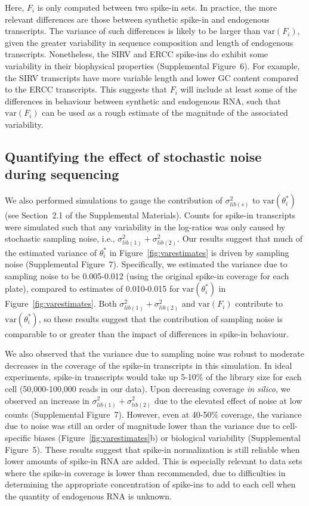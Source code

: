 \documentclass{article}
\newcommand{\suppfigcell}{5}
\newcommand{\suppfigbiophys}{6}
\newcommand{\suppfignoise}{7}
\newcommand{\suppsecnoise}{2.1}
\newcommand\variance{\mbox{var}}
\begin{document}
Here, $F_i$ is only computed between two spike-in sets.
In practice, the more relevant differences are those between synthetic spike-in and endogenous transcripts.
The variance of such differences is likely to be larger than $\variance(F_i)$, given the greater variability in sequence composition and length of endogenous transcripts.
Nonetheless, the SIRV and ERCC spike-ins do exhibit some variability in their biophysical properties (Supplemental Figure~\suppfigbiophys{}).
For example, the SIRV transcripts have more variable length and lower GC content compared to the ERCC transcripts.
This suggests that $F_i$ will include at least some of the differences in behaviour between synthetic and endogenous RNA, such that $\variance(F_i)$ can be used as a rough estimate of the magnitude of the associated variability.

\subsection*{Quantifying the effect of stochastic noise during sequencing}
We also performed simulations to gauge the contribution of $\sigma^2_{lib(s)}$ to $\variance(\theta^*_i)$ (see Section~\suppsecnoise{} of the Supplemental Materials).
Counts for spike-in transcripts were simulated such that any variability in the log-ratios was only caused by stochastic sampling noise, i.e., $\sigma^2_{lib(1)} + \sigma^2_{lib(2)}$.
Our results suggest that much of the estimated variance of $\theta^*_i$ in Figure~\ref{fig:varestimates} is driven by sampling noise (Supplemental Figure~\suppfignoise{}).
Specifically, we estimated the variance due to sampling noise to be 0.005-0.012 (using the original spike-in coverage for each plate), compared to estimates of 0.010-0.015 for $\variance(\theta^*_i)$ in Figure~\ref{fig:varestimates}.
Both $\sigma^2_{lib(1)} + \sigma^2_{lib(2)}$ and  $\variance(F_i)$ contribute to  $\variance(\theta^*_i)$, so these results suggest that the contribution of sampling noise is comparable to or greater than the impact of differences in spike-in behaviour.

We also observed that the variance due to sampling noise was robust to moderate decreases in the coverage of the spike-in transcripts in this simulation.
In ideal experiments, spike-in transcripts would take up 5-10\% of the library size for each cell (50,000-100,000 reads in our data).
Upon decreasing coverage \textit{in silico}, we observed an increase in $\sigma^2_{lib(1)} + \sigma^2_{lib(2)}$ due to the elevated effect of noise at low counts (Supplemental Figure~\suppfignoise{}).
However, even at 40-50\% coverage, the variance due to noise was still an order of magnitude lower than the variance due to cell-specific biases (Figure~\ref{fig:varestimates}b) or biological variability (Supplemental Figure~\suppfigcell{}).
These results suggest that spike-in normalization is still reliable when lower amounts of spike-in RNA are added.
This is especially relevant to data sets where the spike-in coverage is lower than recommended, due to difficulties in determining the appropriate concentration of spike-ins to add to each cell when the quantity of endogenous RNA is unknown.
\end{document}
